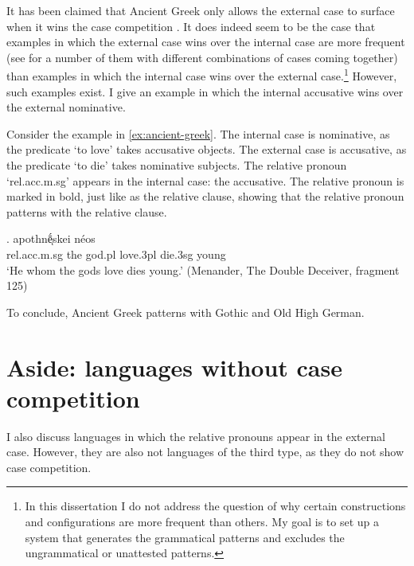 It has been claimed that Ancient Greek only allows the external case to surface when it wins the case competition  \citep[cf.][]{cinqueforthcoming}. It does indeed seem to be the case that examples in which the external case wins over the internal case are more frequent (see \citealt{kakarikos2014} for a number of them with different combinations of cases coming together) than examples in which the internal case wins over the external case.\footnote{
In this dissertation I do not address the question of why certain constructions and configurations are more frequent than others. My goal is to set up a system that generates the grammatical patterns and excludes the ungrammatical or unattested patterns.
}
However, such examples exist. I give an example in which the internal accusative wins over the external nominative.

Consider the example in \ref{ex:ancient-greek}.
The internal case is nominative, as the predicate  `to love' takes accusative objects.
The external case is accusative, as the predicate  `to die' takes nominative subjects.
The relative pronoun  `\ac{rel}.\ac{acc}.\ac{m}.\ac{sg}' appears in the internal case: the accusative. The relative pronoun is marked in bold, just like as the relative clause, showing that the relative pronoun patterns with the relative clause.

\exg.     apothnḗͅskei néos\\
\ac{rel}.\ac{acc}.\ac{m}.\ac{sg} the god.\ac{pl} love.3\ac{pl} die.3\ac{sg} young\\
`He whom the gods love dies young.' (Menander, The Double Deceiver, fragment 125)\label{ex:ancient-greek}

To conclude, Ancient Greek patterns with Gothic and Old High German.



\section{Aside: languages without case competition}\label{sec:potentiel-counterexamples}









I also discuss languages in which the relative pronouns appear in the external case. However, they are also not languages of the third type, as they do not show case competition.



